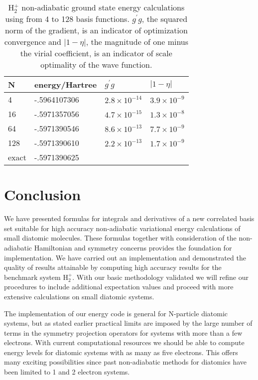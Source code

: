 \documentclass[12pt]{article}
\begin{document}
\begin{table}[p] \centering
\begin{tabular}
[c]{llll}\hline\hline
N & energy/Hartree & $g^{\prime}g$ & $\left|  1-\eta\right|  $\\\hline
4 & -.5964107306 & $2.8\times10^{-14}$ & $3.9\times10^{-9}$\\
16 & -.5971357056 & $4.7\times10^{-15}$ & $1.3\times10^{-8}$\\
64 & -.5971390546 & $8.6\times10^{-13}$ & $7.7\times10^{-9}$\\
128 & -.5971390610 & $2.2\times10^{-13}$ & $1.7\times10^{-9}$\\
exact\cite{Bishop77} & -.5971390625 &  & \\\hline\hline
\end{tabular}
\caption{H$_{2}^{+}%
$  non-adiabatic ground state energy calculations using from 4 to 128 basis functions.
$g^{\prime}%
g$, the squared norm of the gradient, is an indicator of optimization convergence and
$\left| 1-\eta\right
| $, the magnitude of one minus the virial coefficient, is an indicator of scale optimality
of the wave function.
\label{H2pRes}}%
\end{table}%

\section{Conclusion}

We have presented formulas for integrals and derivatives of a new correlated
basis set suitable for high accuracy non-adiabatic variational energy
calculations of small diatomic molecules. These formulas together with
consideration of the non-adiabatic Hamiltonian and symmetry concerns provides
the foundation for implementation. We have carried out an implementation and
demonstrated the quality of results attainable by computing high accuracy
results for the benchmark system H$_{2}^{+}$. With our basic methodology
validated we will refine our procedures to include additional expectation
values and proceed with more extensive calculations on small diatomic systems.

The implementation of our energy code is general for N-particle diatomic
systems, but as stated earlier practical limits are imposed by the large
number of terms in the symmetry projection operators for systems with more
than a few electrons. With current computational resources we should be able
to compute energy levels for diatomic systems with as many as five electrons.
This offers many exciting possibilities since past non-adiabatic methods for
diatomics have been limited to 1 and 2 electron systems.
\end{document}
